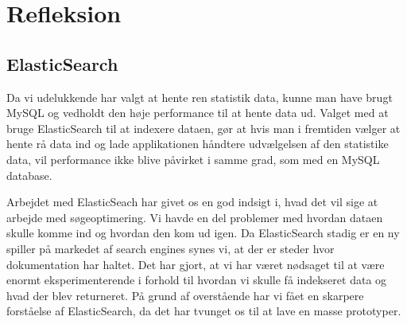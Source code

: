 \section{Refleksion}
\subsection{ElasticSearch}
Da vi udelukkende har valgt at hente ren statistik data, kunne man have brugt MySQL og vedholdt den høje performance til at hente data ud. 
Valget med at bruge ElasticSearch til at indexere dataen, gør at hvis man i fremtiden vælger at hente rå data ind og lade applikationen håndtere
udvælgelsen af den statistike data, vil performance ikke blive påvirket i samme grad, som med en MySQL database.

Arbejdet med ElasticSeach har givet os en god indsigt i, hvad det vil sige at arbejde med søgeoptimering.
Vi havde en del problemer med hvordan dataen skulle komme ind og hvordan den kom ud igen. 
Da ElasticSearch stadig er en ny spiller på markedet af search engines synes vi, at der er steder hvor dokumentation har haltet.
Det har gjort, at vi har været nødsaget til at være enormt eksperimenterende i forhold til hvordan vi skulle få indekseret data og hvad der blev returneret.
På grund af overstående har vi fået en skarpere forståelse af ElasticSearch, da det har tvunget os til at lave en masse prototyper.

